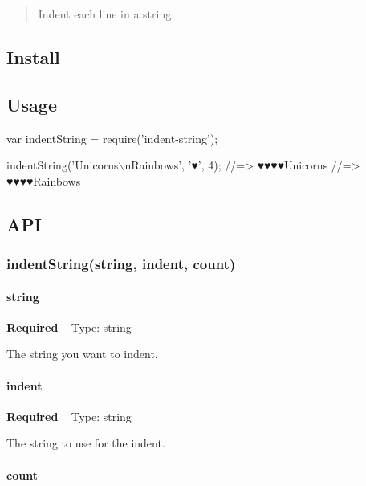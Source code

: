 \begin{quote}
Indent each line in a string \end{quote}


\subsection*{Install}




\subsection*{Usage}


\begin{DoxyCode}
var indentString = require('indent-string');

indentString('Unicorns\(\backslash\)nRainbows', '♥', 4);
//=> ♥♥♥♥Unicorns
//=> ♥♥♥♥Rainbows
\end{DoxyCode}


\subsection*{A\+PI}

\subsubsection*{indent\+String(string, indent, count)}

\paragraph*{string}

{\bfseries Required} ~\newline
Type\+: {\ttfamily string}

The string you want to indent.

\paragraph*{indent}

{\bfseries Required} ~\newline
Type\+: {\ttfamily string}

The string to use for the indent.

\paragraph*{count}

